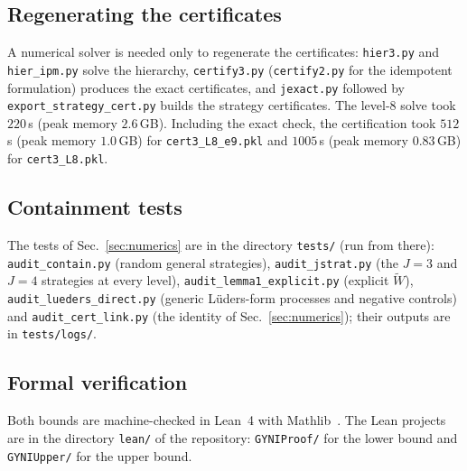 \documentclass[aps,pra,onecolumn,notitlepage,superscriptaddress,longbibliography,nofootinbib,11pt]{revtex4-2}
\theoremstyle{remark}
\newcommand{\file}[1]{\texttt{#1}}
\begin{document}
\subsection{Regenerating the certificates}

A numerical solver is needed only to regenerate the certificates: \file{hier3.py} and \file{hier\_ipm.py} solve the hierarchy, \file{certify3.py} (\file{certify2.py} for the idempotent formulation) produces the exact certificates, and \file{jexact.py} followed by \file{export\_strategy\_cert.py} builds the strategy certificates.
The level-8 solve took $220$\,s (peak memory $2.6$\,GB). Including the exact check, the certification took $512$\,s (peak memory $1.0$\,GB) for \file{cert3\_L8\_e9.pkl} and $1005$\,s (peak memory $0.83$\,GB) for \file{cert3\_L8.pkl}.

\subsection{Containment tests}

The tests of Sec.~\ref{sec:numerics} are in the directory \file{tests/} (run from there): \file{audit\_contain.py} (random general strategies), \file{audit\_jstrat.py} (the $J=3$ and $J=4$ strategies at every level), \file{audit\_lemma1\_explicit.py} (explicit $\widetilde W$), \file{audit\_lueders\_direct.py} (generic L\"uders-form processes and negative controls) and \file{audit\_cert\_link.py} (the identity of Sec.~\ref{sec:numerics}); their outputs are in \file{tests/logs/}.

\subsection{Formal verification}\label{sec:lean-formal}

Both bounds are machine-checked in Lean~4 with Mathlib~\cite{Lean4}. The Lean projects are in the directory \file{lean/} of the repository: \file{GYNIProof/} for the lower bound and \file{GYNIUpper/} for the upper bound.
\end{document}
